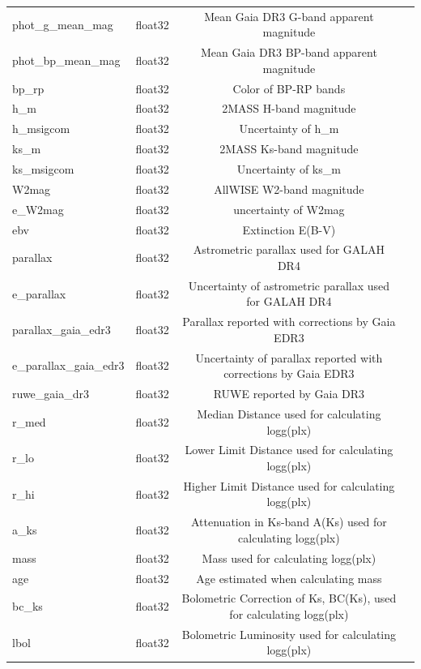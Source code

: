\documentclass[
  journal=pasa,
  manuscript=research-paper, %
  year=2024,
  volume=37
]{cup-journal}
\begin{document}
\begin{table}
\begin{tabular}{lccc}
phot\_g\_mean\_mag	&	float32	&	Mean Gaia DR3 G-band apparent magnitude	&		\\
phot\_bp\_mean\_mag	&	float32	&	Mean Gaia DR3 BP-band apparent magnitude	&		\\
bp\_rp	&	float32	&	Color of BP-RP bands	&		\\
h\_m	&	float32	&	2MASS H-band magnitude	&		\\
h\_msigcom	&	float32	&	Uncertainty of h\_m	&		\\
ks\_m	&	float32	&	2MASS Ks-band magnitude	&		\\
ks\_msigcom	&	float32	&	Uncertainty of ks\_m	&		\\
W2mag	&	float32	&	AllWISE W2-band magnitude	&		\\
e\_W2mag	&	float32	&	uncertainty of W2mag	&		\\
ebv	&	float32	&	Extinction E(B-V)	&		\\
parallax	&	float32	&	Astrometric parallax used for GALAH DR4	&		\\
e\_parallax	&	float32	&	Uncertainty of astrometric parallax used for GALAH DR4	&		\\
parallax\_gaia\_edr3	&	float32	&	Parallax reported with corrections by Gaia EDR3	&		\\
e\_parallax\_gaia\_edr3	&	float32	&	Uncertainty of parallax reported with corrections by Gaia EDR3	&		\\
ruwe\_gaia\_dr3	&	float32	&	RUWE reported by Gaia DR3	&		\\
r\_med	&	float32	&	Median Distance used for calculating logg(plx)	&		\\
r\_lo	&	float32	&	Lower Limit Distance used for calculating logg(plx)	&		\\
r\_hi	&	float32	&	Higher Limit Distance used for calculating logg(plx)	&		\\
a\_ks	&	float32	&	Attenuation in Ks-band A(Ks) used for calculating logg(plx)	&		\\
mass	&	float32	&	Mass used for calculating logg(plx)	&		\\
age	&	float32	&	Age estimated when calculating mass	&		\\
bc\_ks	&	float32	&	Bolometric Correction of Ks, BC(Ks), used for calculating logg(plx)	&		\\
lbol	&	float32	&	Bolometric Luminosity used for calculating logg(plx)	&		\\
\hline
\end{tabular}
\end{table}
\end{document}
